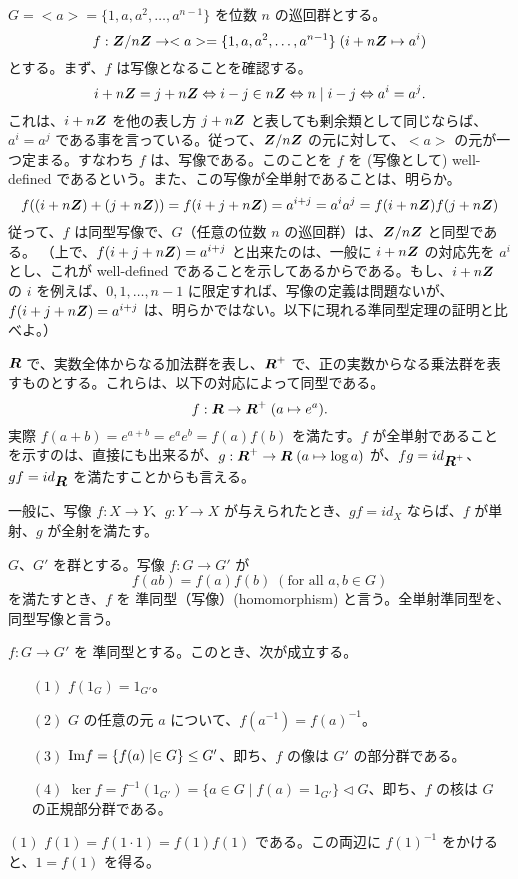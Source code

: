 \begin{eg}
$G = <a> = \{1, a, a^2, \ldots, a^{n-1}\}$ を位数 $n$ の巡回群とする。
$$f:\mbox{\boldmath $Z$}/n\mbox{\boldmath $Z$} \to <a> = \{1, a, a^2, \ldots, a^{n-1}\} \;(i + n\mbox{\boldmath $Z$} \mapsto a^i)$$
とする。まず、$f$ は写像となることを確認する。
$$i + n\mbox{\boldmath $Z$} = j + n\mbox{\boldmath $Z$} \Leftrightarrow i - j \in n\mbox{\boldmath $Z$} \Leftrightarrow n\mid i-j \Leftrightarrow a^i = a^j.$$
これは、$i + n\mbox{\boldmath $Z$}$ を他の表し方 $j + n\mbox{\boldmath $Z$}$ と表しても剰余類として同じならば、$a^i = a^j$ である事を言っている。従って、$\mbox{\boldmath $Z$}/n\mbox{\boldmath $Z$}$ の元に対して、$<a>$ の元が一つ定まる。すなわち $f$ は、写像である。このことを $f$ を (写像として) well-defined であるという。また、この写像が全単射であることは、明らか。
$$f((i+n\mbox{\boldmath $Z$}) + (j+n\mbox{\boldmath $Z$})) = f(i+j + n\mbox{\boldmath $Z$}) = a^{i+j} = a^ia^j = f(i+n\mbox{\boldmath $Z$})f(j+n\mbox{\boldmath $Z$})$$
従って、$f$ は同型写像で、$G$（任意の位数 $n$ の巡回群）は、$\mbox{\boldmath $Z$}/n\mbox{\boldmath $Z$}$ と同型である。
（上で、$f(i+j + n\mbox{\boldmath $Z$}) = a^{i+j}$ と出来たのは、一般に $i + n\mbox{\boldmath $Z$}$ の対応先を $a^i$ とし、これが well-defined であることを示してあるからである。もし、$i + n\mbox{\boldmath $Z$}$ の $i$ を例えば、$0,1,\ldots, n-1$  に限定すれば、写像の定義は問題ないが、$f(i+j + n\mbox{\boldmath $Z$}) = a^{i+j}$ は、明らかではない。以下に現れる準同型定理の証明と比べよ。）
\end{eg}

\begin{eg}
$\mbox{\boldmath $R$}$ で、実数全体からなる加法群を表し、$\mbox{\boldmath $R$}^+$ で、正の実数からなる乗法群を表すものとする。これらは、以下の対応によって同型である。
$$f : \mbox{\boldmath $R$} \to \mbox{\boldmath $R$}^+\;(a\mapsto e^a).$$
実際 $f(a+b) = e^{a+b} = e^ae^b = f(a)f(b)$ を満たす。$f$ が全単射であることを示すのは、直接にも出来るが、$g : \mbox{\boldmath $R$}^+ \to \mbox{\boldmath $R$}\;(a\mapsto \log a)$ が、$fg = id_{\mbox{\boldmath $R$}^+}$、$gf = id_{\mbox{\boldmath $R$}}$ を満たすことからも言える。

\smallskip
一般に、写像 $f:X\to Y$、$g:Y\to X$ が与えられたとき、$gf = id_X$ ならば、$f$ が単射、$g$ が全射を満たす。
\end{eg}

\begin{definition}
$G$、$G'$ を群とする。写像 $f:G\to G'$ が
$$f(ab) = f(a)f(b)\;(\mbox{for all }a,b\in G)$$
を満たすとき、$f$ を 準同型（写像）(homomorphism) と言う。全単射準同型を、同型写像と言う。
\end{definition}

\begin{prop} \label{prop:ker+im}
$f:G\to G'$ を 準同型とする。このとき、次が成立する。
\begin{itemize}
\item[$(1)$] $f(1_G) = 1_{G'}$。
\item[$(2)$] $G$ の任意の元 $a$ について、$f(a^{-1}) = f(a)^{-1}$。
\item[$(3)$] $\mbox{{\rm Im}} f = \{f(a)\mid \in G\}\leq G'$、即ち、$f$ の像は $G'$ の部分群である。
\item[$(4)$] $\ker f = f^{-1}(1_{G'}) = \{a\in G\mid f(a) = 1_{G'}\}\lhd G$、即ち、$f$ の核は $G$ の正規部分群である。
\end{itemize}
\end{prop}
\proof
$(1)$ $f(1) = f(1\cdot 1) = f(1)f(1)$ である。この両辺に $f(1)^{-1}$ をかけると、$1 = f(1)$ を得る。

